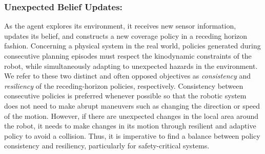 \documentclass[letterpaper]{article} %
\begin{document}
\subsubsection{Unexpected Belief Updates:} \hfill
\vspace{-0.25pt}

\noindent
As the agent explores its environment, it receives new sensor information, updates its belief, and constructs a new coverage policy in a receding horizon fashion.
Concerning a physical system in the real world, policies generated during consecutive planning episodes must respect the kinodynamic constraints of the robot, while simultaneously adapting to unexpected hazards in the environment.
We refer to these two distinct and often opposed objectives as \textit{consistency} and \textit{resiliency} of the receding-horizon policies, respectively.
Consistency between consecutive policies is preferred whenever possible so that the robotic system does not need to make abrupt maneuvers such as changing the direction or speed of the motion.
However, if there are unexpected changes in the local area around the robot, it needs to make changes in its motion through resilient and adaptive policy to avoid a collision.
Thus, it is imperative to find a balance between policy consistency and resiliency, particularly for safety-critical systems.
\end{document}
